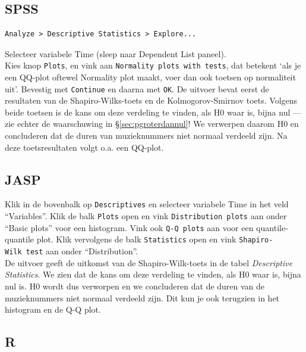 \documentclass[
]{book}
\begin{document}
\hypertarget{spss-4}{%
\subsection{SPSS}\label{spss-4}}

\begin{verbatim}
Analyze > Descriptive Statistics > Explore...
\end{verbatim}

Selecteer variabele Time (sleep naar Dependent List paneel).\\
Kies knop \texttt{Plots}, en vink aan \texttt{Normality\ plots\ with\ tests}, dat
betekent `als je een QQ-plot oftewel Normality plot maakt, voer dan ook toetsen
op normaliteit uit'. Bevestig met \texttt{Continue} en daarna met \texttt{OK}. De
uitvoer bevat eerst de resultaten van de Shapiro-Wilks-toets en de
Kolmogorov-Smirnov toets. Volgens beide toetsen is de kans om deze
verdeling te vinden, als H0 waar is, bijna nul --- zie echter de
waarschuwing in
§\ref{sec:pgroterdannul}! We verwerpen daarom H0 en concluderen
dat de duren van muzieknummers niet normaal verdeeld zijn. Na deze
toetsresultaten volgt o.a. een QQ-plot.

\hypertarget{jasp-6}{%
\subsection{JASP}\label{jasp-6}}

Klik in de bovenbalk op \texttt{Descriptives} en selecteer variabele Time in het veld ``Variables''. Klik de balk \texttt{Plots} open en vink \texttt{Distribution\ plots} aan onder ``Basic plots'' voor een histogram. Vink ook \texttt{Q-Q\ plots} aan voor een quantile-quantile plot. Klik vervolgens de balk \texttt{Statistics} open en vink \texttt{Shapiro-Wilk\ test} aan onder ``Distribution''.\\
De uitvoer geeft de uitkomst van de Shapiro-Wilk-toets in de tabel \emph{Descriptive Statistics}. We zien dat de kans om deze verdeling te vinden, als H0 waar is, bijna nul is. H0 wordt dus verworpen en we concluderen dat de duren van de muzieknummers niet normaal verdeeld zijn. Dit kun je ook terugzien in het histogram en de Q-Q plot.

\hypertarget{r-6}{%
\subsection{R}\label{r-6}}
\end{document}
